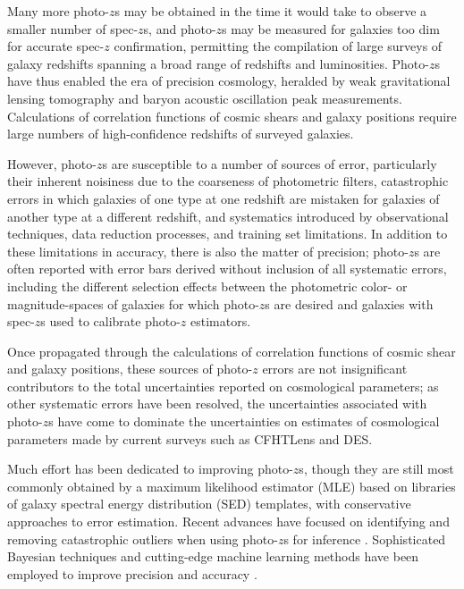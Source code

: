 Many more photo-$z$s may be obtained in the time it would take to observe a smaller number of spec-$z$s, and photo-$z$s may be measured for galaxies too dim for accurate spec-$z$ confirmation, permitting the compilation of large surveys of galaxy redshifts spanning a broad range of redshifts and luminosities.  
Photo-$z$s have thus enabled the era of precision cosmology, heralded by weak gravitational lensing tomography and baryon acoustic oscillation peak measurements.  
Calculations of correlation functions of cosmic shears and galaxy positions require large numbers of high-confidence redshifts of surveyed galaxies.  

However, photo-$z$s are susceptible to a number of sources of error, particularly their inherent noisiness due to the coarseness of photometric filters, catastrophic errors in which galaxies of one type at one redshift are mistaken for galaxies of another type at a different redshift, and systematics introduced by observational techniques, data reduction processes, and training set limitations.  
In addition to these limitations in accuracy, there is also the matter of precision; photo-$z$s are often reported with error bars derived without inclusion of all systematic errors, including the different selection effects between the photometric color- or magnitude-spaces of galaxies for which photo-$z$s are desired and galaxies with spec-$z$s used to calibrate photo-$z$ estimators.

Once propagated through the calculations of correlation functions of cosmic shear and galaxy positions, these sources of photo-$z$ errors are not insignificant contributors to the total uncertainties reported on cosmological parameters; as other systematic errors have been resolved, the uncertainties associated with photo-$z$s have come to dominate the uncertainties on estimates of cosmological parameters made by current surveys such as CFHTLens and DES.

Much effort has been dedicated to improving photo-$z$s, though they are still most commonly obtained by a maximum likelihood estimator (MLE) based on libraries of galaxy spectral energy distribution (SED) templates, with conservative approaches to error estimation.  
Recent advances have focused on identifying and removing catastrophic outliers when using photo-$z$s for 
inference \citep{Gorecki2014}.  
Sophisticated Bayesian techniques and cutting-edge machine learning methods have been employed to improve precision \citep{Carliles2010} and accuracy \citep{Sadeh2015}. 

